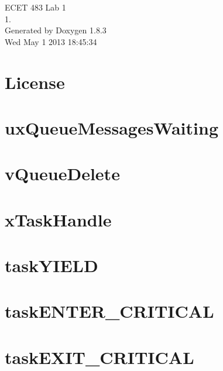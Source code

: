 \documentclass{book}
\begin{document}
\hypersetup{pageanchor=false,citecolor=blue}
\begin{titlepage}
\vspace*{7cm}
\begin{center}
{\Large E\-C\-E\-T 483 Lab 1 \\[1ex]\large 1. }\\
\vspace*{1cm}
{\large Generated by Doxygen 1.8.3}\\
\vspace*{0.5cm}
{\small Wed May 1 2013 18:45:34}\\
\end{center}
\end{titlepage}
\clearemptydoublepage
{}
\tableofcontents
\clearemptydoublepage
{}
\hypersetup{pageanchor=true,citecolor=blue}
\chapter{License}
\label{License}
\hypertarget{License}{}

\chapter{ux\-Queue\-Messages\-Waiting}
\label{uxQueueMessagesWaiting}
\hypertarget{uxQueueMessagesWaiting}{}

\chapter{v\-Queue\-Delete}
\label{vQueueDelete}
\hypertarget{vQueueDelete}{}

\chapter{x\-Task\-Handle}
\label{xTaskHandle}
\hypertarget{xTaskHandle}{}

\chapter{task\-Y\-I\-E\-L\-D}
\label{taskYIELD}
\hypertarget{taskYIELD}{}

\chapter{task\-E\-N\-T\-E\-R\-\_\-\-C\-R\-I\-T\-I\-C\-A\-L}
\label{taskENTER_CRITICAL}
\hypertarget{taskENTER_CRITICAL}{}

\chapter{task\-E\-X\-I\-T\-\_\-\-C\-R\-I\-T\-I\-C\-A\-L}
\label{taskEXIT_CRITICAL}
\hypertarget{taskEXIT_CRITICAL}{}

\end{document}
